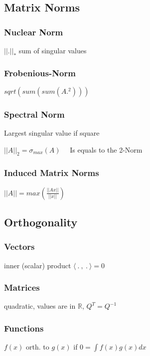 \documentclass[11pt,twocolumn]{article}
\begin{document}
\subsection{Matrix Norms}

\subsubsection{Nuclear Norm}

$|| . ||_*$ sum of singular values

\subsubsection{Frobenious-Norm}
$sqrt(sum(sum(A.^2)))$

\subsubsection{Spectral Norm} 
Largest singular value if square 

$||A||_2 = \sigma_{max}(A)$ 
~~Is equals to the 2-Norm

\subsubsection{Induced Matrix Norms}
$ ||A|| = max \left( \frac{ ||Ax|| }{ ||x|| } \right)$

\subsection{Orthogonality}

\subsubsection{Vectors} 

inner (scalar) product $\langle ~.~,~.~ \rangle = 0$

\subsubsection{Matrices} 

quadratic, values are in $\mathbb{R}$, $Q^T = Q^{-1}$

\subsubsection{Functions}

$f(x)$ orth. to $g(x)$ if $0 = \int f(x) g(x) dx $
\end{document}
